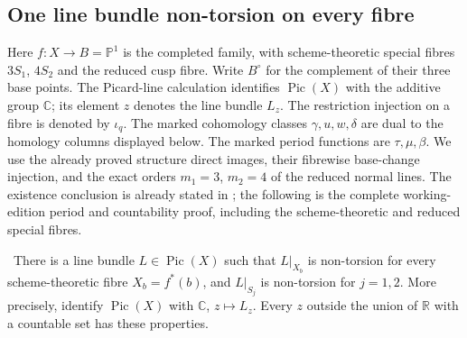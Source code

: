 \subsection{One line bundle non-torsion on every fibre}

Here $f:X\to B=\mathbb P^1$ is the completed family, with
scheme-theoretic special fibres $3S_1$, $4S_2$ and the reduced cusp
fibre.  Write $B^\circ$ for the complement of their three base points.
The Picard-line calculation identifies $\operatorname{Pic}(X)$ with
the additive group $\mathbb C$; its element $z$ denotes the line
bundle $L_z$.  The restriction injection on a fibre is denoted by
$\iota_q$.  The marked cohomology classes $\gamma,u,w,\delta$ are
dual to the homology columns displayed below.  The marked period
functions are $\tau,\mu,\beta$.  We use the already proved structure
direct images, their fibrewise base-change injection, and the exact
orders $m_1=3$, $m_2=4$ of the reduced normal lines.
The existence conclusion is already stated in
\cite[Corollary~9.22, p.~81]{AC2026}; the following is the complete
working-edition period and countability proof, including the
scheme-theoretic and reduced special fibres.

\begin{theorem}
\label{wb:thm:uniform-nontorsion-audit}
\ There is a line bundle \(L\in\operatorname{Pic}(X)\) such that
\(L|_{X_b}\) is non-torsion for every scheme-theoretic fibre
\(X_b=f^*(b)\), and \(L|_{S_j}\) is non-torsion for \(j=1,2\).
More precisely, identify \(\operatorname{Pic}(X)\) with \(\mathbb C\),
\(z\mapsto L_z\).  Every \(z\) outside the union of \(\mathbb R\) with a
countable set has these properties.
\end{theorem}

